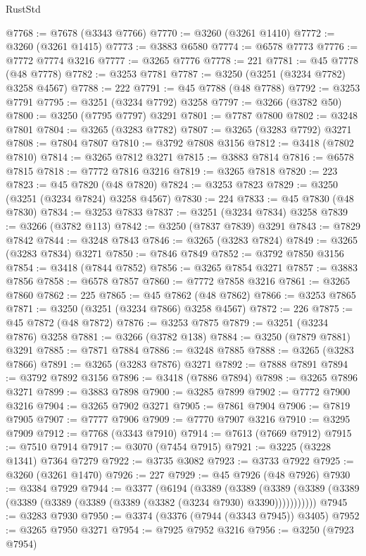 \begin{lexlean}{RustStd}
\begin{coremodule}
@7768 := @7678 (@3343 @7766)
@7770 := @3260 (@3261 @1410)
@7772 := @3260 (@3261 @1415)
@7773 := @3883 @6580
@7774 := @6578 @7773
@7776 := @7772 @7774 @3216
@7777 := @3265 @7776
@7778 := 221
@7781 := @45 @7778 (@48 @7778)
@7782 := @3253 @7781
@7787 := @3250 (@3251 (@3234 @7782) @3258 @4567)
@7788 := 222
@7791 := @45 @7788 (@48 @7788)
@7792 := @3253 @7791
@7795 := @3251 (@3234 @7792) @3258
@7797 := @3266 (@3782 @50)
@7800 := @3250 (@7795 @7797) @3291
@7801 := @7787 @7800
@7802 := @3248 @7801
@7804 := @3265 (@3283 @7782)
@7807 := @3265 (@3283 @7792) @3271
@7808 := @7804 @7807
@7810 := @3792 @7808 @3156
@7812 := @3418 (@7802 @7810)
@7814 := @3265 @7812 @3271
@7815 := @3883 @7814
@7816 := @6578 @7815
@7818 := @7772 @7816 @3216
@7819 := @3265 @7818
@7820 := 223
@7823 := @45 @7820 (@48 @7820)
@7824 := @3253 @7823
@7829 := @3250 (@3251 (@3234 @7824) @3258 @4567)
@7830 := 224
@7833 := @45 @7830 (@48 @7830)
@7834 := @3253 @7833
@7837 := @3251 (@3234 @7834) @3258
@7839 := @3266 (@3782 @113)
@7842 := @3250 (@7837 @7839) @3291
@7843 := @7829 @7842
@7844 := @3248 @7843
@7846 := @3265 (@3283 @7824)
@7849 := @3265 (@3283 @7834) @3271
@7850 := @7846 @7849
@7852 := @3792 @7850 @3156
@7854 := @3418 (@7844 @7852)
@7856 := @3265 @7854 @3271
@7857 := @3883 @7856
@7858 := @6578 @7857
@7860 := @7772 @7858 @3216
@7861 := @3265 @7860
@7862 := 225
@7865 := @45 @7862 (@48 @7862)
@7866 := @3253 @7865
@7871 := @3250 (@3251 (@3234 @7866) @3258 @4567)
@7872 := 226
@7875 := @45 @7872 (@48 @7872)
@7876 := @3253 @7875
@7879 := @3251 (@3234 @7876) @3258
@7881 := @3266 (@3782 @138)
@7884 := @3250 (@7879 @7881) @3291
@7885 := @7871 @7884
@7886 := @3248 @7885
@7888 := @3265 (@3283 @7866)
@7891 := @3265 (@3283 @7876) @3271
@7892 := @7888 @7891
@7894 := @3792 @7892 @3156
@7896 := @3418 (@7886 @7894)
@7898 := @3265 @7896 @3271
@7899 := @3883 @7898
@7900 := @3285 @7899
@7902 := @7772 @7900 @3216
@7904 := @3265 @7902 @3271
@7905 := @7861 @7904
@7906 := @7819 @7905
@7907 := @7777 @7906
@7909 := @7770 @7907 @3216
@7910 := @3295 @7909
@7912 := @7768 (@3343 @7910)
@7914 := @7613 (@7669 @7912)
@7915 := @7510 @7914
@7917 := @3070 (@7454 @7915)
@7921 := @3225 (@3228 @1341) @7364 @7279
@7922 := @3735 @3082
@7923 := @3733 @7922
@7925 := @3260 (@3261 @1470)
@7926 := 227
@7929 := @45 @7926 (@48 @7926)
@7930 := @3384 @7929
@7944 := @3377
    (@6194
      (@3389
        (@3389
          (@3389 (@3389 (@3389 (@3389 (@3389 (@3389 (@3389 (@3382 (@3234 @7930) @3390)))))))))))
@7945 := @3283 @7930
@7950 := @3374 (@3376 (@7944 (@3343 @7945)) @3405)
@7952 := @3265 @7950 @3271
@7954 := @7925 @7952 @3216
@7956 := @3250 (@7923 @7954)

\end{coremodule}
\end{lexlean}
